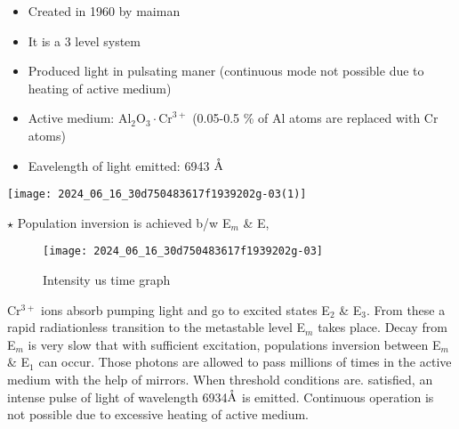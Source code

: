\documentclass[12pt, a4paper]{article}
\begin{document}

\begin{itemize}
	\item Created in 1960 by maiman
	\item It is a 3 level system
	\item Produced light in pulsating maner (continuous mode not possible due to heating of active medium)
	\item Active medium: $\mathrm{Al}_{2} \mathrm{O}_{3} \cdot \mathrm{Cr}^{3+}$ (0.05-0.5 \% of Al atoms are replaced with Cr atoms)
	\item Eavelength of light emitted: 6943 $\mathring{\textrm{A}}$
\end{itemize}

\begin{center}
	\texttt{[image: 2024\_06\_16\_30d750483617f1939202g-03(1)]}
\end{center}

$\star$ Population inversion is achieved b/w E$_m$ \& E,
\pagebreak
\begin{figure*}
	\texttt{[image: 2024\_06\_16\_30d750483617f1939202g-03]}
	\caption*{Intensity us time graph}
\end{figure*}

Cr$^{3+}$ ions absorb pumping light and go to excited states E$_2$ \& E$_3$. From these a rapid radiationless transition to the metastable level E$_m$ takes place. Decay from E$_m$ is very slow that with sufficient excitation, populations inversion between E$_m$ \& E$_1$ can occur. Those photons are allowed to pass millions of times in the active medium with the help of mirrors. When threshold conditions are. satisfied, an intense pulse of light of wavelength 6934$\mathring{\textrm{A}}$ is emitted. Continuous operation is not possible due to excessive heating of active medium.

\bigskip
\end{document}
